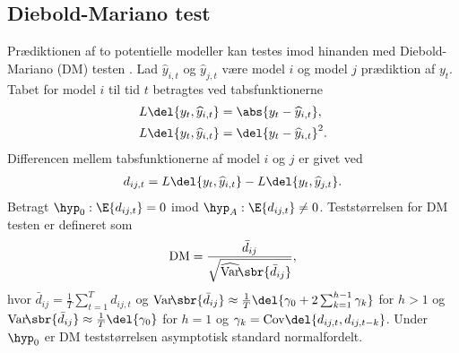\subsection{Diebold-Mariano test}
Prædiktionen af to potentielle modeller kan testes imod hinanden med Diebold-Mariano (DM) testen \citep{dmtest}.
Lad \(\widehat{y}_{i,t}\) og \(\widehat{y}_{j,t}\) være model \(i\) og model \(j\) prædiktion af \(y_{t}\).
Tabet for model \(i\) til tid \(t\) betragtes ved tabsfunktionerne
\begin{align}
L \del{y_t, \widehat{y}_{i,t}} &= \abs{y_t - \widehat{y}_{i,t}}, \label{eq:lossMAE} \\
L \del{y_t, \widehat{y}_{i,t}} &= \del{y_t - \widehat{y}_{i,t}}^2. \label{eq:lossMSE}
\end{align}
Differencen mellem tabsfunktionerne af model \(i\) og \(j\) er givet ved 
\begin{align*}
d_{ij,t} = L \del{y_t, \widehat{y}_{i,t}} - L \del{y_t, \widehat{y}_{j,t}}.
\end{align*}
%
Betragt \(\hyp_0 : \E{d_{ij,t}} = 0\) imod \(\hyp_A: \E{d_{ij,t}} \neq 0\). Teststørrelsen for DM testen er defineret som
\begin{align*}
\text{DM} = \frac{\bar{d}_{ij}}{\sqrt{\widehat{\mathrm{Var}}\!\sbr{\bar{d}_{ij}}}},
\end{align*}
hvor \(\bar{d}_{ij} = \frac{1}{T} \sum_{t = 1}^T d_{ij,t}\) og 
\(\mathrm{Var}\!\sbr{\bar{d}_{ij}} \approx \frac{1}{T} \del{\gamma_0 + 2 \sum_{k=1}^{h-1} \gamma_k}\) for \(h > 1 \) og \(\mathrm{Var}\!\sbr{\bar{d}_{ij}} \approx \frac{1}{T} \del{\gamma_0}\) for \(h = 1\) og \(\gamma_k = \text{Cov} \del{d_{ij,t}, d_{ij,t-k}}\). 
%
Under \(\hyp_0\) er DM teststørrelsen asymptotisk standard normalfordelt. 
